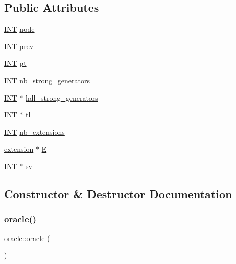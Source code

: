 \subsection*{Public Attributes}
\begin{DoxyCompactItemize}
\item 
\mbox{\hyperlink{galois_8h_a09fddde158a3a20bd2dcadb609de11dc}{I\+NT}} \mbox{\hyperlink{classoracle_a97308ab682eff43b6894082a88e8a611}{node}}
\item 
\mbox{\hyperlink{galois_8h_a09fddde158a3a20bd2dcadb609de11dc}{I\+NT}} \mbox{\hyperlink{classoracle_ad17b620d60e6cec94e9d22a9bc984177}{prev}}
\item 
\mbox{\hyperlink{galois_8h_a09fddde158a3a20bd2dcadb609de11dc}{I\+NT}} \mbox{\hyperlink{classoracle_aa8c6db158546ea7a7e59bac20e981313}{pt}}
\item 
\mbox{\hyperlink{galois_8h_a09fddde158a3a20bd2dcadb609de11dc}{I\+NT}} \mbox{\hyperlink{classoracle_a7ce51ce1f022b500312d0a74910eb4ff}{nb\+\_\+strong\+\_\+generators}}
\item 
\mbox{\hyperlink{galois_8h_a09fddde158a3a20bd2dcadb609de11dc}{I\+NT}} $\ast$ \mbox{\hyperlink{classoracle_a1e1d99338dc5474da6b5e3501d068641}{hdl\+\_\+strong\+\_\+generators}}
\item 
\mbox{\hyperlink{galois_8h_a09fddde158a3a20bd2dcadb609de11dc}{I\+NT}} $\ast$ \mbox{\hyperlink{classoracle_ab0f096217fa19f077b5eeebf9753bc43}{tl}}
\item 
\mbox{\hyperlink{galois_8h_a09fddde158a3a20bd2dcadb609de11dc}{I\+NT}} \mbox{\hyperlink{classoracle_ac86093a08487f10e31ed64eeb48350a6}{nb\+\_\+extensions}}
\item 
\mbox{\hyperlink{classextension}{extension}} $\ast$ \mbox{\hyperlink{classoracle_a2b1e31455effcbf5679e646fe79b02bc}{E}}
\item 
\mbox{\hyperlink{galois_8h_a09fddde158a3a20bd2dcadb609de11dc}{I\+NT}} $\ast$ \mbox{\hyperlink{classoracle_a2973d5eaa94029a1c165d8b4770b2faa}{sv}}
\end{DoxyCompactItemize}


\subsection{Constructor \& Destructor Documentation}
\mbox{\label{classoracle_ad561602c9076eb46eebce4defa982caf}} 
\subsubsection{\texorpdfstring{oracle()}{oracle()}}
{\footnotesize\ttfamily oracle\+::oracle (\begin{DoxyParamCaption}{ }\end{DoxyParamCaption})}


